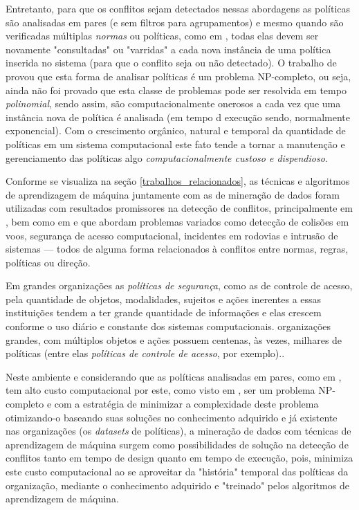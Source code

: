 Entretanto, para que os conflitos sejam detectados nessas abordagens as políticas são analisadas em pares (e sem filtros para agrupamentos) e mesmo quando são verificadas múltiplas \textit{normas} ou políticas, como em \cite{eduardo2017}, todas elas devem ser novamente "consultadas" ou "varridas" a cada nova instância de uma política inserida no sistema (para que o conflito seja ou não detectado). O trabalho de \cite{shoham_tennenholtz_1995} provou que esta forma de analisar políticas é um problema NP-completo, ou seja, ainda não foi provado que esta classe de problemas pode ser resolvida em tempo \textit{polinomial}, sendo assim, são computacionalmente onerosos a cada vez que uma instância nova de política é analisada (em tempo d execução sendo, normalmente exponencial). Com o crescimento orgânico, natural e temporal da quantidade de políticas em um sistema computacional este fato tende a tornar a manutenção e gerenciamento das políticas algo \textit{computacionalmente custoso e dispendioso}.   

Conforme se visualiza na seção \ref{trabalhos_relacionados}, as técnicas e algoritmos de aprendizagem de máquina juntamente com as de mineração de dados foram utilizadas com resultados promissores na detecção de conflitos, principalmente em \cite{obaidat_multilayer_1994}, \cite{chen_flight_2011} bem como em \cite{christodoulou_collision_2008} e \cite{jin_development_2002} que abordam problemas variados como detecção de colisões em voos, segurança de acesso computacional, incidentes em rodovias e intrusão de sistemas --- todos de alguma forma relacionados à conflitos entre normas, regras, políticas ou direção.  

Em grandes organizações as \textit{políticas de segurança}, como as de controle de acesso, pela quantidade de objetos, modalidades, sujeitos e ações inerentes a essas instituições tendem a ter grande quantidade de informações e elas crescem conforme o uso diário e constante dos sistemas computacionais. organizações grandes, com múltiplos objetos e ações possuem centenas, às vezes, milhares de políticas (entre elas \textit{políticas de controle de acesso}, por exemplo).\cite{fugini_information_2004}.

Neste ambiente e considerando que as políticas analisadas em pares, como em \cite{sarkis2017}, tem alto custo computacional por este, como visto em \cite{shoham_tennenholtz_1995}, ser um problema NP-completo e com a estratégia de minimizar a complexidade deste problema otimizando-o baseando suas soluções no conhecimento adquirido e já existente nas organizações (os \textit{datasets} de políticas), a mineração de dados com técnicas de aprendizagem de máquina surgem como possibilidades de solução na detecção de conflitos tanto em tempo de design quanto em tempo de execução, pois, minimiza este custo computacional ao se aproveitar da "história" temporal das políticas da organização, mediante o conhecimento adquirido e "treinado" pelos algoritmos de aprendizagem de máquina.

